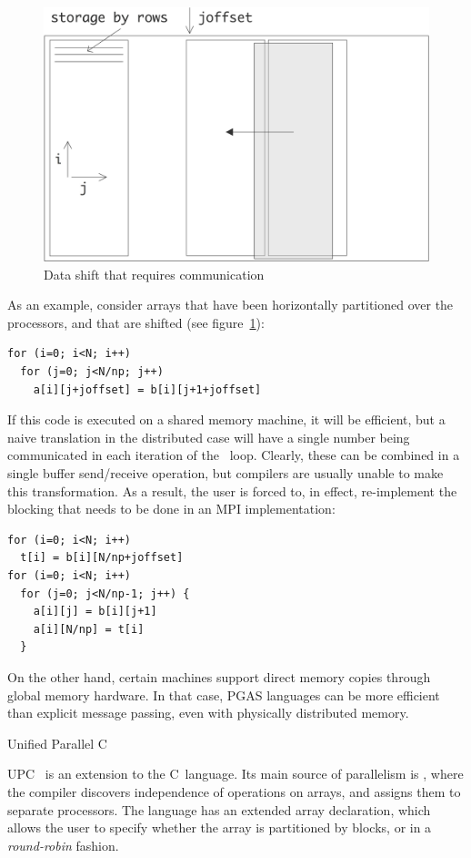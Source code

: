 \begin{figure}[ht]
  \includegraphics[scale=.12]{graphics/abshift}
  \caption{Data shift that requires communication}
  \label{fig:abshift}
\end{figure}
As an example, consider arrays  that have been horizontally
partitioned over the processors, and that are shifted (see figure~\ref{fig:abshift}):
\begin{verbatim}
for (i=0; i<N; i++)
  for (j=0; j<N/np; j++)
    a[i][j+joffset] = b[i][j+1+joffset]
\end{verbatim}
If this code is executed on a shared memory machine, it will be
efficient, but a naive translation in the distributed case will have a
single number being communicated in each iteration of the
~loop. Clearly, these can be combined in a single buffer
send/receive operation, but compilers are usually
unable to make this transformation. As a result, the user is forced
to, in effect, re-implement the blocking that needs to be done in an
MPI implementation:
\begin{verbatim}
for (i=0; i<N; i++)
  t[i] = b[i][N/np+joffset]
for (i=0; i<N; i++)
  for (j=0; j<N/np-1; j++) {
    a[i][j] = b[i][j+1]
    a[i][N/np] = t[i]
  }
\end{verbatim}

On the other hand, certain machines support direct memory copies
through global memory hardware. In that case, \ac{PGAS} languages can
be more efficient than explicit message passing, even with physically
distributed memory.

 {Unified Parallel C}

\acf{UPC}~\cite{UPC:homepage} is an extension to the C~language.  Its
main source of parallelism is , where
the compiler discovers independence of operations on
arrays, and assigns them to separate processors. The language has an
extended array declaration, which allows the user to specify whether
the array is partitioned by blocks, or in a
\emph{round-robin}
fashion.

